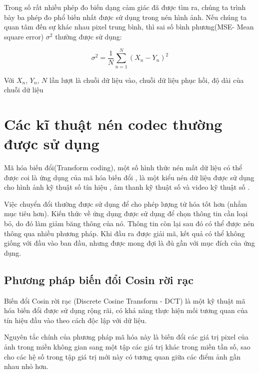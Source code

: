 Trong số rất nhiều phép đo biến dạng cảm giác đã được tìm ra,
chúng ta trình bày ba phép đo phổ biến nhất được sử dụng
trong nén hình ảnh. Nếu chúng ta quan tâm đến sự khác nhau
pixel trung bình, thì sai số bình phương(MSE- Mean square error)
$\sigma^2$ thường được sử dụng:

\begin{equation}
    \sigma^2 =  \frac{1}{N} \sum_{n=1}^{N} {\left( {X_n-Y_n} \right)}^2
\end{equation}

Với $X_n$, $Y_n$, $N$ lần lượt là chuỗi dữ liệu vào, chuỗi dữ liệu phục hồi,
độ dài của chuỗi dữ liệu

\section{Các kĩ thuật nén codec thường được sử dụng}


Mã hóa biến đổi(Transform coding), một số hình thức nén mất dữ liệu có thể được coi là ứng dụng
của mã hóa biến đổi , là một kiểu nén dữ liệu được sử dụng cho
hình ảnh kỹ thuật số tín hiệu , âm thanh kỹ thuật số và video kỹ thuật số .

Việc chuyển đổi thường được sử dụng để cho phép lượng tử
hóa tốt hơn (nhắm mục tiêu hơn). Kiến thức về ứng dụng được
sử dụng để chọn thông tin cần loại bỏ, do đó làm giảm băng
thông của nó. Thông tin còn lại sau đó có thể được nén thông
qua nhiều phương pháp. Khi đầu ra được giải mã, kết quả có
thể không giống với đầu vào ban đầu, nhưng được mong đợi là
đủ gần với mục đích của ứng dụng.

\subsection{Phương pháp biến đổi Cosin rời rạc}

Biến đổi Cosin rời rạc (Discrete Cosine Transform - DCT)
là một kỹ thuật mã hóa biến đổi được sử dụng rộng rãi,
có khả năng thực hiện mối tương quan của tín hiệu đầu vào
theo cách độc lập với dữ liệu.

Nguyên tắc chính của phương pháp mã hóa này là biến đổi các
giá trị pixel của ảnh trong miền không gian sang một tập các
giá trị khác trong miền tần số, sao cho các hệ số trong tập giá
trị mới này có tương quan giữa các điểm ảnh gần nhau nhỏ hơn.

